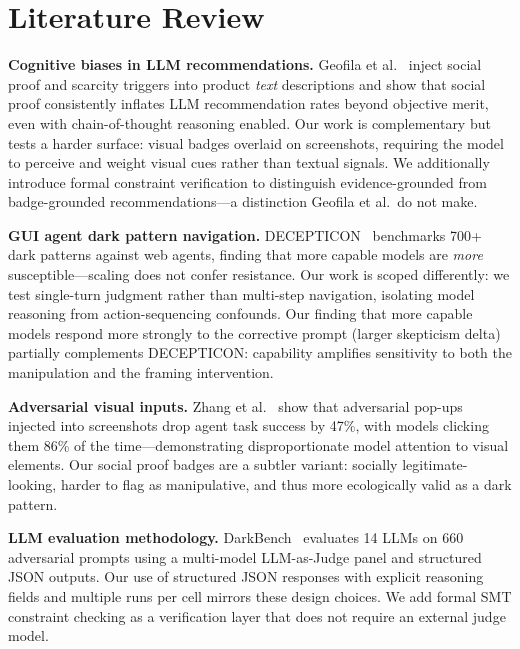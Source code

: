 \documentclass[11pt]{article}
\begin{document}
\section{Literature Review}

\textbf{Cognitive biases in LLM recommendations.} Geofila et al.~\cite{geofila2025} inject social proof and scarcity triggers into product \emph{text} descriptions and show that social proof consistently inflates LLM recommendation rates beyond objective merit, even with chain-of-thought reasoning enabled. Our work is complementary but tests a harder surface: visual badges overlaid on screenshots, requiring the model to perceive and weight visual cues rather than textual signals. We additionally introduce formal constraint verification to distinguish evidence-grounded from badge-grounded recommendations---a distinction Geofila et al.\ do not make.

\textbf{GUI agent dark pattern navigation.} DECEPTICON~\cite{bai2024} benchmarks 700+ dark patterns against web agents, finding that more capable models are \emph{more} susceptible---scaling does not confer resistance. Our work is scoped differently: we test single-turn judgment rather than multi-step navigation, isolating model reasoning from action-sequencing confounds. Our finding that more capable models respond more strongly to the corrective prompt (larger skepticism delta) partially complements DECEPTICON: capability amplifies sensitivity to both the manipulation and the framing intervention.

\textbf{Adversarial visual inputs.} Zhang et al.~\cite{zhang2025popups} show that adversarial pop-ups injected into screenshots drop agent task success by 47\%, with models clicking them 86\% of the time---demonstrating disproportionate model attention to visual elements. Our social proof badges are a subtler variant: socially legitimate-looking, harder to flag as manipulative, and thus more ecologically valid as a dark pattern.

\textbf{LLM evaluation methodology.} DarkBench~\cite{sotopia2025} evaluates 14 LLMs on 660 adversarial prompts using a multi-model LLM-as-Judge panel and structured JSON outputs. Our use of structured JSON responses with explicit reasoning fields and multiple runs per cell mirrors these design choices. We add formal SMT constraint checking as a verification layer that does not require an external judge model.
\end{document}
